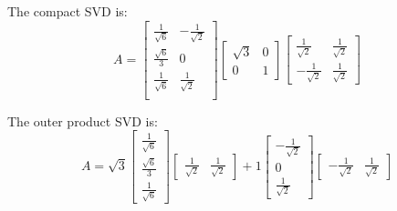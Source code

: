 \begin{enumerate}
{    The compact SVD is:
    \begin{equation}
      A = 
      \begin{bmatrix}
      \frac{1}{\sqrt{6}} & -\frac{1}{\sqrt{2}} \\
      \frac{\sqrt{6}}{3} & 0 \\
      \frac{1}{\sqrt{6}} & \frac{1}{\sqrt{2}} \\ \end{bmatrix}
      \begin{bmatrix} \sqrt{3} & 0 \\ 0 & 1 \end{bmatrix}
      \begin{bmatrix}
      \frac{1}{\sqrt{2}} & \frac{1}{\sqrt{2}} \\
      -\frac{1}{\sqrt{2}} & \frac{1}{\sqrt{2}} \end{bmatrix} 
    \end{equation}

    The outer product SVD is:
    \begin{equation}
      A = \sqrt{3} \begin{bmatrix} \frac{1}{\sqrt{6}} \\ \frac{\sqrt{6}}{3} \\ \frac{1}{\sqrt{6}} \end{bmatrix} \begin{bmatrix} \frac{1}{\sqrt{2}} & \frac{1}{\sqrt{2}} \end{bmatrix}
        + 1 \begin{bmatrix} -\frac{1}{\sqrt{2}} \\ 0 \\ \frac{1}{\sqrt{2}} \end{bmatrix} \begin{bmatrix} -\frac{1}{\sqrt{2}} & \frac{1}{\sqrt{2}} \end{bmatrix}
    \end{equation}
  }
\end{enumerate}









